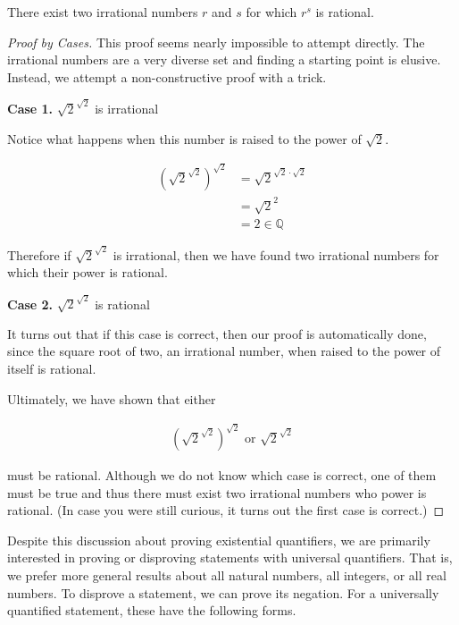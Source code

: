 \documentclass{report}
\newcommand{\header}[2]{\begin{flushright} \textbf{#1} #2 \end{flushright}}
\begin{document}
\vspace{\baselineskip}
\begin{theorem}
	There exist two irrational numbers $r$ and $s$ for which $r^s$ is rational.
\end{theorem}

\begin{proof}[Proof by Cases]
	This proof seems nearly impossible to attempt directly. The irrational numbers are a very diverse set and finding a starting point is elusive. Instead, we attempt a non-constructive proof with a trick.
	
	\header{Case 1. }{$\sqrt{2}^{\sqrt{2}}$ is irrational}
	Notice what happens when this number is raised to the power of $\sqrt{2}$.
	
	\begin{align*}
		\left( \sqrt{2}^{\sqrt{2}} \right)^{\sqrt{2}} &= \sqrt{2}^{\sqrt{2} \cdot \sqrt{2}} \\
		&= \sqrt{2}^2 \\
		&= 2 \in \mathbb{Q}
	\end{align*}
	
	Therefore if $\sqrt{2}^{\sqrt{2}}$ is irrational, then we have found two irrational numbers for which their power is rational.
	
	\header{Case 2. }{$\sqrt{2}^{\sqrt{2}}$ is rational}
	
	It turns out that if this case is correct, then our proof is automatically done, since the square root of two, an irrational number, when raised to the power of itself is rational.
	
	Ultimately, we have shown that either
	
	\begin{align*}
		\left( \sqrt{2}^{\sqrt{2}} \right)^{\sqrt{2}} \text{ or } \sqrt{2}^{\sqrt{2}}
	\end{align*}
	
	must be rational. Although we do not know which case is correct, one of them must be true and thus there must exist two irrational numbers who power is rational. (In case you were still curious, it turns out the first case is correct.)
\end{proof}
\vspace{\baselineskip}

Despite this discussion about proving existential quantifiers, we are primarily interested in proving or disproving statements with universal quantifiers. That is, we prefer more general results about all natural numbers, all integers, or all real numbers. To disprove a statement, we can prove its negation. For a universally quantified statement, these have the following forms.
\end{document}
